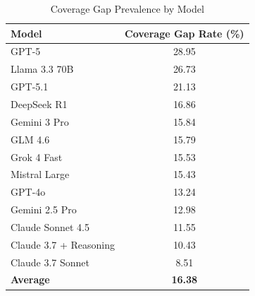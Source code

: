 \begin{table}[htbp]
\centering
\caption{Coverage Gap Prevalence by Model}
\label{tab:coverage_gap_prevalence}
\begin{tabular}{lc}
\toprule
\textbf{Model} & \textbf{Coverage Gap Rate (\%)} \\
\midrule
GPT-5 & 28.95 \\
Llama 3.3 70B & 26.73 \\
GPT-5.1 & 21.13 \\
DeepSeek R1 & 16.86 \\
Gemini 3 Pro & 15.84 \\
GLM 4.6 & 15.79 \\
Grok 4 Fast & 15.53 \\
Mistral Large & 15.43 \\
GPT-4o & 13.24 \\
Gemini 2.5 Pro & 12.98 \\
Claude Sonnet 4.5 & 11.55 \\
Claude 3.7 + Reasoning & 10.43 \\
Claude 3.7 Sonnet & 8.51 \\
\midrule
\textbf{Average} & \textbf{16.38} \\
\bottomrule
\end{tabular}
\end{table}
